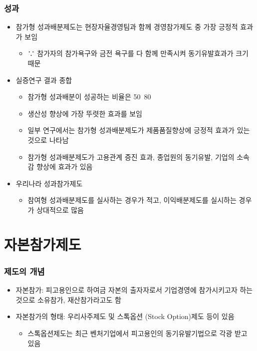 \documentclass[aspectratio=169,xcolor=dvipsnames,handout]{beamer}
\begin{document}
\begin{frame}[allowframebreaks]
    \frametitle{성과}
    \begin{itemize}[<+->]
        \item 참가형 성과배분제도는 현장자율경영팀과 함께 경영참가제도 중 가장 긍정적 효과가 보임
        \begin{itemize}[<+->]
            \item ∵ 참가자의 참가욕구와 금전 욕구를 다 함께 만족시켜 동기유발효과가 크기 때문
        \end{itemize}
        \item 실증연구 결과 종합
        \begin{itemize}[<+->]
            \item 참가형 성과배분이 성공하는 비율은 50~80%
            \item 생산성 향상에 가장 뚜렷한 효과를 보임
            \item 일부 연구에서는 참가형 성과배분제도가 제품품질향상에 긍정적 효과가 있는 것으로 나타남
            \item 참가형 성과배분제도가 고용관계 증진 효과, 종업원의 동기유발, 기업의 소속감 향상에 효과가 있음
        \end{itemize}
        \item 우리나라 성과참가제도
        \begin{itemize}[<+->]
            \item 참여형 성과배분제도를 실사하는 경우가 적고, 이익배분제도를 실시하는 경우가 상대적으로 많음
        \end{itemize}
    \end{itemize}
\end{frame}

\section{자본참가제도}%

\begin{frame}[allowframebreaks]
    \frametitle{제도의 개념}
    \begin{itemize}[<+->]
        \item 자본참가: 피고용인으로 하여금 자본의 출자자로서 기업경영에 참가시키고자 하는 것으로 소유참가, 재산참가라고도 함
        \item 자본참가의 형태: 우리사주제도 및 스톡옵션 (Stock Option)제도 등이 있음
        \begin{itemize}[<+->]
            \item 스톡옵션제도는 최근 벤처기업에서 피고용인의 동기유발기법으로 각광 받고 있음
        \end{itemize}
    \end{itemize}
\end{frame}
\end{document}
